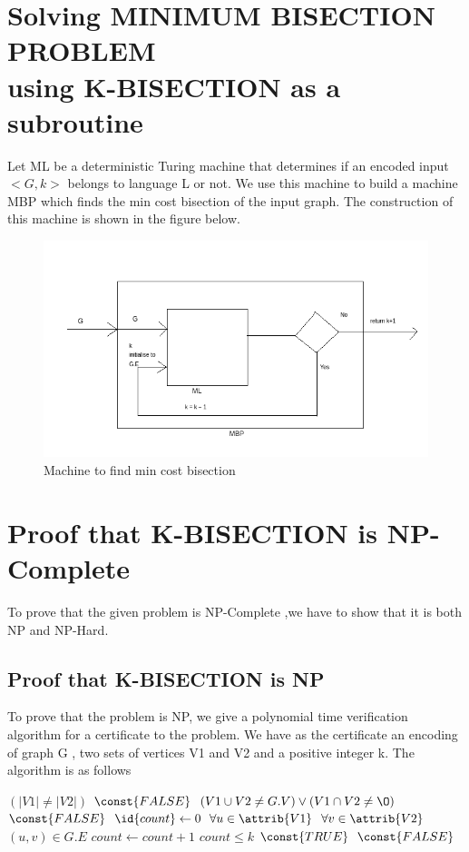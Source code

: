 \documentclass[10pt]{article}
\begin{document}
\section{Solving MINIMUM BISECTION PROBLEM \\
using K-BISECTION as a subroutine}
Let ML be a deterministic Turing machine that determines if an encoded input $<G,k>$ belongs to language L or not. We use this machine to build a machine MBP which finds the min cost bisection of the input graph. The construction of this machine is shown in the figure below.

\begin{figure}[h!]
    \includegraphics[width=\linewidth]{MBP.png}
    \caption{Machine to find min cost bisection}
    \label{fig:MBP}
\end{figure}

\section{Proof that K-BISECTION is NP-Complete}
To prove that the given problem is NP-Complete ,we have to show that it is both NP and NP-Hard.
\subsection{Proof that K-BISECTION is NP}
To prove that the problem is NP, we give a polynomial time verification algorithm for a certificate to the problem. We have as the certificate an encoding of  graph G , two sets of vertices V1 and V2 and a positive integer k. The algorithm is as follows


\begin{codebox}

\li \If $(|V1| \neq |V2|)$
     \Then
\li     \Return $\const{FALSE}$
     \End
\li \If $(V1 \cup V2 \neq G.V) \lor (V1 \cap V2 \neq \O)$
    \Then
\li     \Return $\const{FALSE}$
    \End
\li $\id{count} \gets 0$
\li \For $\forall u \in  \attrib{V1}$  \Do
\li      \For $\forall v \in  \attrib{V2}$ \Do  
\li         \If $(u,v) \in G.E$ \Then   
\li              $count \gets count + 1$
            \End
        \End
    \End
\li\If $count \leq k$ \Then   
\li         \Return $\const{TRUE}$
     \End
\li\Return $\const{FALSE}$      
\end{codebox}
\end{document}
